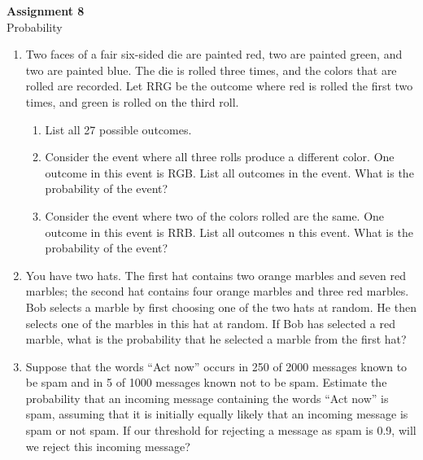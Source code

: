 \documentclass[11pt, letterpaper, includehead]{article}
\theoremstyle{plain}
\theoremstyle{mydefinition}
\theoremstyle{myproperty}
\begin{document}
 

\pagestyle{fancy}
\fancyhead{}
\fancyfoot{}


\begin{center}
    \Large{\textbf{Assignment 8}}\\
    \Large{Probability}
\end{center}

\begin{enumerate}[label=\textbf{\arabic*}., leftmargin=*]
\item Two faces of a fair six-sided die are painted red, two are painted green, and two are painted blue. The die is rolled three times, and the colors that are rolled are recorded. Let RRG be the outcome where red is rolled the first two times, and green is rolled on the third roll.
\begin{enumerate}[label=(\alph*)]
    \item List all 27 possible outcomes.
    \item Consider the event where all three rolls produce a different color. One outcome in this event is RGB. List all outcomes in the event. What is the probability of the event?
    \item Consider the event where two of the colors rolled are the same. One outcome in this event is RRB. List all outcomes n this event. What is the probability of the event?
\end{enumerate}

\item You have two hats. The first hat contains two orange marbles and seven red marbles; the second hat contains four orange marbles and three red marbles. Bob selects a marble by first choosing one of the two hats at random. He then selects one of the marbles in this hat at random. If Bob has selected a red marble, what is the probability that he selected a marble from the first hat?

\item  Suppose that the words ``Act now'' occurs in 250 of 2000 messages known to be spam and in 5 of 1000 messages known not to be spam. Estimate the probability that an incoming message containing the words ``Act now'' is spam, assuming that it is initially equally likely that an incoming message is spam or not spam. If our threshold for rejecting a message as spam is 0.9, will we reject this incoming message?

\end{enumerate}
\end{document}
